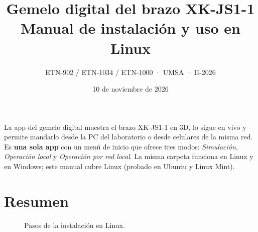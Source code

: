 \documentclass[a4paper,11pt]{article}
\title{\textbf{Gemelo digital del brazo XK-JS1-1}\\[4pt]\large Manual de instalación y uso en Linux}
\author{ETN-902 / ETN-1034 / ETN-1000 · UMSA · II-2026}
\date{10 de noviembre de 2026}
\begin{document}
\maketitle
\thispagestyle{fancy}

La app del gemelo digital muestra el brazo XK-JS1-1 en 3D, lo sigue en vivo y permite mandarlo desde la PC del laboratorio o desde celulares de la misma red. Es \textbf{una sola app} con un menú de inicio que ofrece tres modos: \emph{Simulación}, \emph{Operación local} y \emph{Operación por red local}. La misma carpeta funciona en Linux y en Windows; este manual cubre Linux (probado en Ubuntu y Linux Mint).

\tableofcontents
\newpage

\section{Resumen}
\begin{figure}[H]
\centering
{}
\caption{Pasos de la instalación en Linux.}
\end{figure}

\end{document}
